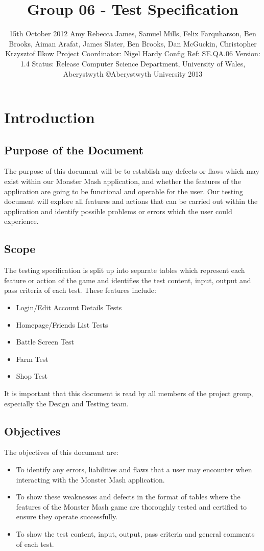 \documentclass[titlepage]{article}
\title{Group 06 - Test Specification}
\date{15th October 2012 \linebreak Amy Rebecca James, Samuel Mills, Felix Farquharson, \linebreak Ben Brooks, Aiman Arafat, James Slater, Ben Brooks, Dan McGuckin, Christopher Krzysztof Ilkow \linebreak Project Coordinator: Nigel Hardy \linebreak Config Ref: SE.QA.06 \linebreak Version: 1.4 \linebreak Status: Release \linebreak Computer Science Department, University of Wales, Aberystwyth \linebreak \copyright Aberystwyth University 2013}
\begin{document}
\maketitle
\newpage
\tableofcontents 
\newpage 
\section{Introduction} 
\subsection{Purpose of the Document}
The purpose of this document will be to establish any defects or flaws which may exist within our Monster Mash application, and whether the features of the application are going to be functional and operable for the user. Our testing document will explore all features and actions that can be carried out within the application and identify possible problems or errors which the user could experience. 
\subsection{Scope}
The testing specification is split up into separate tables which represent each feature or action of the game and identifies the test content, input, output and pass criteria of each test. These features include:
\begin{itemize}
\item Login/Edit Account Details Tests
\item Homepage/Friends List Tests
\item Battle Screen Test
\item Farm Test
\item Shop Test
\end{itemize}
It is important that this document is read by all members of the project group, especially the Design and Testing team.
\subsection{Objectives}
The objectives of this document are:
\begin{itemize}
\item To identify any errors, liabilities and flaws that a user may encounter when interacting with the Monster Mash application. 
\item To show these weaknesses and defects in the format of tables where the features of the Monster Mash game are thoroughly tested and certified to ensure they operate successfully. 
\item To show the test content, input, output, pass criteria and general comments of each test.
\end{itemize}  
\newpage
\end{document}
